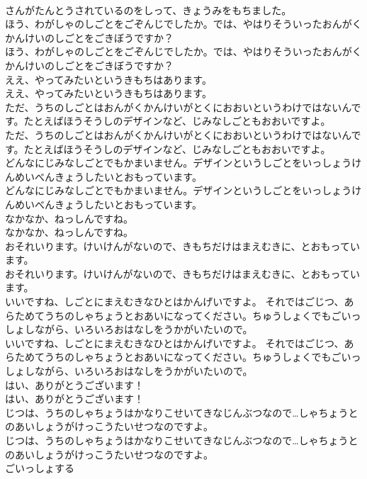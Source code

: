 \documentclass[8pt]{extreport}
\begin{document}
\begin{CJK}{UTF8}{min}
\\	さんがたんとうされているのをしって、きょうみをもちました。 
\\	ほう、わがしゃのしごとをごぞんじでしたか。では、やはりそういったおんがくかんけいのしごとをごきぼうですか？	
\\	ほう、わがしゃのしごとをごぞんじでしたか。では、やはりそういったおんがくかんけいのしごとをごきぼうですか？ 
\\	ええ、やってみたいというきもちはあります。	
\\	ええ、やってみたいというきもちはあります。 
\\	ただ、うちのしごとはおんがくかんけいがとくにおおいというわけではないんです。たとえばほうそうしのデザインなど、じみなしごともおおいですよ。	
\\	ただ、うちのしごとはおんがくかんけいがとくにおおいというわけではないんです。たとえばほうそうしのデザインなど、じみなしごともおおいですよ。 
\\	どんなにじみなしごとでもかまいません。デザインというしごとをいっしょうけんめいべんきょうしたいとおもっています。	
\\	どんなにじみなしごとでもかまいません。デザインというしごとをいっしょうけんめいべんきょうしたいとおもっています。 
\\	なかなか、ねっしんですね。	
\\	なかなか、ねっしんですね。 
\\	おそれいります。けいけんがないので、きもちだけはまえむきに、とおもっています。	
\\	おそれいります。けいけんがないので、きもちだけはまえむきに、とおもっています。 
\\	いいですね、しごとにまえむきなひとはかんげいですよ。 それではごじつ、あらためてうちのしゃちょうとおあいになってください。ちゅうしょくでもごいっしょしながら、いろいろおはなしをうかがいたいので。	
\\	いいですね、しごとにまえむきなひとはかんげいですよ。 それではごじつ、あらためてうちのしゃちょうとおあいになってください。ちゅうしょくでもごいっしょしながら、いろいろおはなしをうかがいたいので。 
\\	はい、ありがとうございます！	
\\	はい、ありがとうございます！ 
\\	じつは、うちのしゃちょうはかなりこせいてきなじんぶつなので…しゃちょうとのあいしょうがけっこうたいせつなのですよ。	
\\	じつは、うちのしゃちょうはかなりこせいてきなじんぶつなので…しゃちょうとのあいしょうがけっこうたいせつなのですよ。 
\\	ごいっしょする

\end{CJK}
\end{document}
